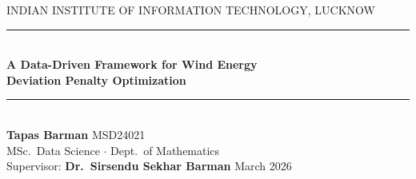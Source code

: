 \documentclass[aspectratio=169,10pt]{beamer}
\begin{document}
{
\begin{frame}[plain]
  \centering
  \vspace{0.8cm}
  {\tiny\color{white!55}INDIAN INSTITUTE OF INFORMATION TECHNOLOGY, LUCKNOW}\\[0.35cm]
  \rule{0.45\linewidth}{0.3pt}\\[0.4cm]
  {\large\bfseries\color{white}
    A Data-Driven Framework for Wind Energy\\[0.2em]
    Deviation Penalty Optimization}\\[0.5cm]
  \rule{0.45\linewidth}{0.3pt}\\[0.4cm]
  {\small\color{white!85}\textbf{Tapas Barman} \quad MSD24021}\\[0.1cm]
  {\footnotesize\color{white!70}MSc.\ Data Science $\cdot$ Dept.\ of Mathematics}\\[0.25cm]
  {\footnotesize\color{white!65}
    Supervisor: \textbf{Dr.\ Sirsendu Sekhar Barman} \quad March 2026}
\end{frame}
}
\end{document}
